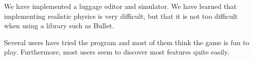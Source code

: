 
We have implemented a luggage editor and simulator. We have learned that implementing realistic physics is very difficult, but that it is not too difficult when using a library such as Bullet.

Several users have tried the program and most of them think the game is fun to play. Furthermore, most users seem to discover most features quite easily. 
